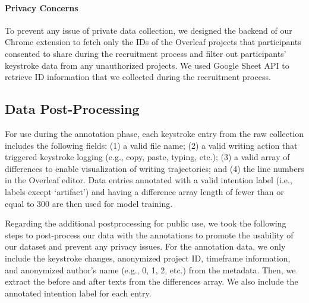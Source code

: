 \paragraph{Privacy Concerns}
To prevent any issue of private data collection, we designed the backend of our Chrome extension to fetch only the IDs of the Overleaf projects that participants consented to share during the recruitment process and filter out participants' keystroke data from any unauthorized projects. We used Google Sheet API to retrieve ID information that we collected during the recruitment process.

\subsection{Data Post-Processing}
\label{sec:appendix:postprocess}

For use during the annotation phase, each keystroke entry from the raw collection includes the following fields: (1) a valid file name; (2) a valid writing action that triggered keystroke logging (e.g., copy, paste, typing, etc.); (3) a valid array of differences to enable visualization of writing trajectories; and (4) the line numbers in the Overleaf editor. Data entries annotated with a valid intention label (i.e., labels except `artifact') and having a difference array length of fewer than or equal to $300$ are then used for model training.

Regarding the additional postprocessing for public use, we took the following steps to post-process our data with the annotations to promote the usability of our dataset and prevent any privacy issues. 
For the annotation data, we only include the keystroke changes, anonymized project ID, timeframe information, and anonymized author's name (e.g., 0, 1, 2, etc.) from the metadata. Then, we extract the before and after texts from the differences array. We also include the annotated intention label for each entry.


